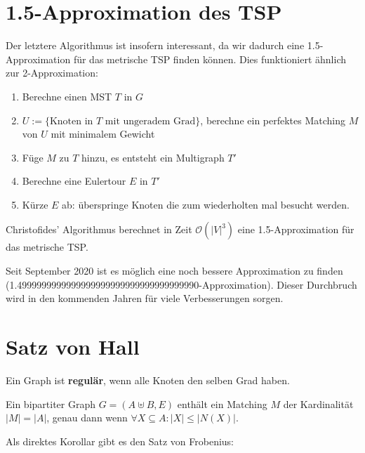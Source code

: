 \section{1.5-Approximation des TSP}

Der letztere Algorithmus ist insofern interessant, da wir dadurch eine 1.5-Approximation für das metrische TSP finden können.
Dies funktioniert ähnlich zur 2-Approximation:
\begin{enumerate}
    \item Berechne einen MST $T$ in $G$
    \item $U := \{\text{Knoten in $T$ mit ungeradem Grad}\}$, berechne ein perfektes Matching $M$ von $U$ mit minimalem Gewicht
    \item Füge $M$ zu $T$ hinzu, es entsteht ein Multigraph $T'$
    \item Berechne eine Eulertour $E$ in $T'$
    \item Kürze $E$ ab: überspringe Knoten die zum wiederholten mal besucht werden.
\end{enumerate}

\begin{satz}[Satz]
    Christofides' Algorithmus berechnet in Zeit $\mathcal{O}(|V|^{3})$ eine 1.5-Approximation für das metrische TSP.
\end{satz}
\bigskip

Seit September 2020 ist es möglich eine noch bessere Approximation zu finden \\ (1.4999999999999999999999999999999999990-Approximation). Dieser Durchbruch wird in den kommenden Jahren für
viele Verbesserungen sorgen.

\section{Satz von Hall}

\begin{definition}
    Ein Graph ist \textbf{regulär}, wenn alle Knoten den selben Grad haben.
\end{definition}

\begin{satz}
    Ein bipartiter Graph $G = (A \uplus B, E)$ enthält ein Matching $M$ der Kardinalität $|M| = |A|$, genau dann
    wenn $\forall X \subseteq A : |X| \leq |N(X)|$.
\end{satz}
\bigskip

Als direktes Korollar gibt es den Satz von Frobenius:

